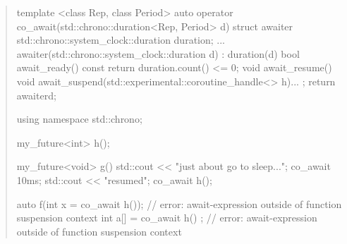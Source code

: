 \begin{quote}
\begin{codeblock}
template <class Rep, class Period>
auto operator co_await(std::chrono::duration<Rep, Period> d) {
  struct awaiter {
    std::chrono::system_clock::duration duration;
    ...
    awaiter(std::chrono::system_clock::duration d) : duration(d){}
    bool await_ready() const { return duration.count() <= 0; }
    void await_resume() {}
    void await_suspend(std::experimental::coroutine_handle<> h){...}
  };
  return awaiter{d};
}

using namespace std::chrono;

my_future<int> h();

my_future<void> g() {
  std::cout << "just about go to sleep...\n";
  co_await 10ms;
  std::cout << "resumed\n";
  co_await h();
}

auto f(int x = co_await h()); // error: await-expression outside of function suspension context
int a[] = { co_await h() }; // error: await-expression outside of function suspension context

\end{codeblock}
\exitexample%

\end{quote}
%
%
%
%
%
%
%
%
%
%
%
%
%
%

